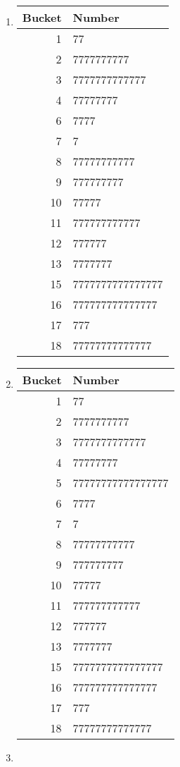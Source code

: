 \documentclass[12pt]{article}
\begin{document}
\begin{enumerate}[a]
\begin{multicols}{2}
\begin{enumerate}[1]
		\item
		\begin{tabular}{r|l}
			Bucket & Number\\\hline\hline
			1 & 77\\\hline
			2 & 7777777777\\\hline
			3 & 7777777777777\\\hline
			4 & 77777777\\\hline
			6 & 7777\\\hline
			7 & 7\\\hline
			8 & 77777777777\\\hline
			9 & 777777777\\\hline
			10 & 77777\\\hline
			11 & 777777777777\\\hline
			12 & 777777\\\hline
			13 & 7777777\\\hline
			15 & 7777777777777777\\\hline
			16 & 777777777777777\\\hline
			17 & 777\\\hline
			18 & 77777777777777
		\end{tabular}
		\item
		\begin{tabular}{r|l}
			Bucket & Number\\\hline\hline
			1 & 77\\\hline
			2 & 7777777777\\\hline
			3 & 7777777777777\\\hline
			4 & 77777777\\\hline
			5 & 77777777777777777\\\hline
			6 & 7777\\\hline
			7 & 7\\\hline
			8 & 77777777777\\\hline
			9 & 777777777\\\hline
			10 & 77777\\\hline
			11 & 777777777777\\\hline
			12 & 777777\\\hline
			13 & 7777777\\\hline
			15 & 7777777777777777\\\hline
			16 & 777777777777777\\\hline
			17 & 777\\\hline
			18 & 77777777777777
		\end{tabular}
		\item
		\begin{tabular}{r|l}

\end{tabular}
\end{enumerate}
\end{multicols}
\end{enumerate}
\end{document}
